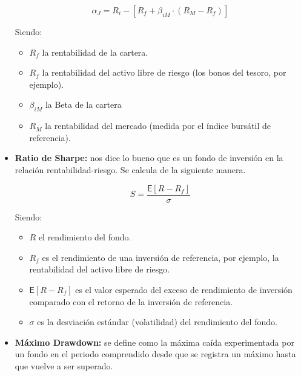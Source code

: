 \documentclass[12pt, a4paper]{book}
\begin{document}
\begin{itemize}
	\begin{center}
		\begin{equation}
		\alpha _{J}=R_{i}-[R_{f}+\beta _{{iM}}\cdot (R_{M}-R_{f})]
		\end{equation}
	\end{center}
	
	Siendo: 
	\begin{itemize}
		\item $R_{f}$ la rentabilidad de la cartera.
		\item $R_{f}$ la rentabilidad del activo libre de riesgo (los bonos del tesoro, por ejemplo).
		\item $\beta _{{iM}} $ la Beta de la cartera
		\item $R_{M}$ la rentabilidad del mercado (medida por el índice bursátil de referencia).
	\end{itemize}
	
	 \newpage
	 
	\item \textbf{Ratio de Sharpe:} nos dice lo bueno que es un fondo de inversión en la relación rentabilidad-riesgo. Se calcula de la siguiente manera.
	
	\begin{center}
		\begin{equation}
		S={\frac {{\textsf {E}}[R-R_{f}]}{\sigma }}
		\end{equation}
	\end{center}
	
		Siendo: 
	\begin{itemize}
		\item $R$ el rendimiento del fondo.
		\item $R_{f}$ es el rendimiento de una inversión de referencia, por ejemplo, la rentabilidad del activo libre de riesgo.
		\item ${\textsf {E}}[R-R_{f}]$ es el valor esperado del exceso de rendimiento de inversión comparado con el retorno de la inversión de referencia.
		\item $\sigma$ es la desviación estándar (volatilidad) del rendimiento del fondo.\\
		
	\end{itemize}
	
	\item \textbf{Máximo Drawdown:} se define como la máxima caída experimentada por un fondo en el periodo comprendido desde que se registra un máximo hasta que vuelve a ser superado.\\
	
\end{itemize}
\end{document}
